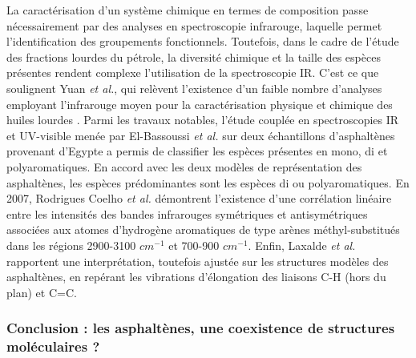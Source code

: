 La caractérisation d'un système chimique en termes de composition passe nécessairement par des analyses en spectroscopie infrarouge, laquelle permet l'identification des groupements fonctionnels. Toutefois, dans le cadre de l'étude des fractions lourdes du pétrole, la diversité chimique et la taille des espèces présentes rendent complexe l'utilisation de la spectroscopie IR. C'est ce que soulignent Yuan \textit{et al.}, qui relèvent l'existence d'un faible nombre d'analyses employant l'infrarouge moyen pour la caractérisation physique et chimique des huiles lourdes \cite{hongfu2006determination}. 
Parmi les travaux notables, l'étude couplée en spectroscopies IR et UV-visible menée par El-Bassoussi \textit{et al.}\cite{el2010characterization} sur deux échantillons d'asphaltènes provenant d'Egypte a permis de classifier les espèces présentes en mono, di et polyaromatiques. En accord avec les deux modèles de représentation des asphaltènes, les espèces prédominantes sont les espèces di ou polyaromatiques. En 2007, Rodrigues Coelho \textit{et al.} \cite{coelho2007characterization} démontrent l'existence d'une corrélation linéaire entre les intensités des bandes infrarouges symétriques et antisymétriques associées aux atomes d'hydrogène aromatiques de type arènes méthyl-substitués dans les régions 2900-3100 $cm^{-1}$ et 700-900 $cm^{-1}$. Enfin, Laxalde \textit{et al.} \cite{laxalde2014combining} rapportent une interprétation, toutefois ajustée sur les structures modèles des asphaltènes, en repérant les vibrations d'élongation des liaisons C-H (hors du plan) et C=C.

\bigskip

\subsubsection{Conclusion : les asphaltènes, une coexistence de structures moléculaires ?}

